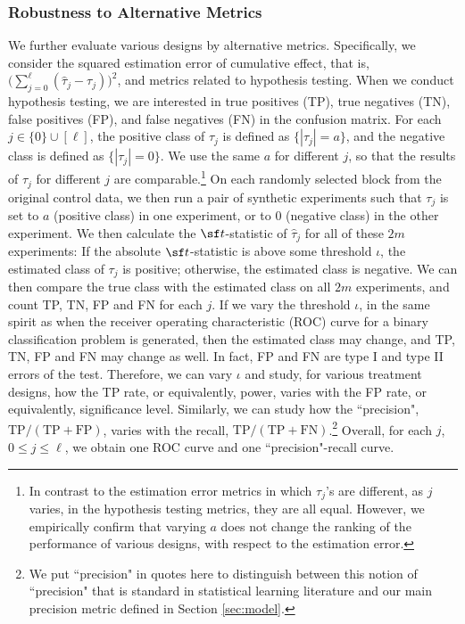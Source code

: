 \subsubsection{Robustness to Alternative Metrics}\label{subsubsec:robustness-to-alternative-metrics}
We further evaluate various designs by alternative metrics. Specifically, we consider the squared estimation error of cumulative effect, that is, $\big(\sum_{j = 0}^{\ell} (\hat \tau_{j} - \tau_j) \big)^2$, and metrics related to hypothesis testing. When we conduct hypothesis testing, we are interested in true positives (TP), true negatives (TN), false positives (FP), and false negatives (FN) in the confusion matrix. For each $j \in \{0\} \cup [\ell]$, the positive class of $\tau_j$ is defined as $\{|\tau_j|=a\}$, and the negative class is defined as $\{|\tau_j|=0\}$. {\blue  We use the same $a$ for different $j$, so that the results of $\tau_j$ for different $j$ are comparable.\footnote{
In contrast to the estimation error metrics in which $\tau_j$'s are different, as $j$ varies, in the hypothesis testing metrics, they are all equal. However, we empirically confirm that varying $a$ does not change the ranking of the performance of various designs, with respect to the estimation error.
} }
On each randomly selected block from the original control data, we then run a pair of synthetic experiments such that $\tau_j$ is set to $a$ (positive class) in one experiment, or to $0$ (negative class) in the other experiment. We then calculate the ${\sf t}$-statistic of $\hat{\tau}_j$ for all of these $2m$ experiments: If the absolute ${\sf t}$-statistic is above some threshold $\iota$, the estimated class of $\tau_j$ is positive; otherwise, the estimated class is negative. We can then compare the true class with the estimated class on all $2m$ experiments, and count TP, TN, FP and FN for each $j$. If we vary the threshold $\iota$, in the same spirit as when the receiver operating characteristic (ROC) curve for a binary classification problem is generated, then the estimated class may change, and TP, TN, FP and FN may change as well. In fact, FP and FN are type I and type II errors of the test.
Therefore, we can vary $\iota$ and study, for various treatment designs, how the TP rate, or equivalently, power, varies with the FP rate, or equivalently, significance level. Similarly, we can study how the ``precision", $\mathrm{TP}/(\mathrm{TP}+\mathrm{FP})$, varies with the recall, $\mathrm{TP}/(\mathrm{TP}+\mathrm{FN})$.\footnote{We put ``precision" in quotes here to distinguish between this notion of ``precision" that is standard in statistical learning literature and our main precision metric defined in Section \ref{sec:model}.} Overall, for each $j$, $0\le j\le \ell$, we obtain one ROC curve and one ``precision"-recall curve.

